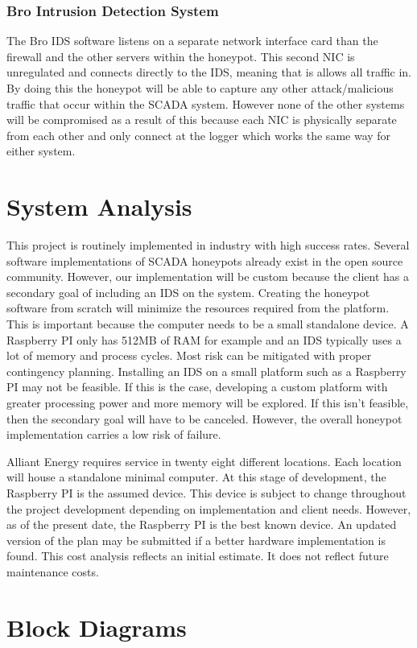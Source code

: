 \subsubsection{Bro Intrusion Detection System}
The Bro IDS software listens on a separate network interface card than the firewall and the other servers within the honeypot.  This second NIC is unregulated and connects directly to the IDS, meaning that is allows all traffic in.  By doing this the honeypot will be able to capture any other attack/malicious traffic that occur within the SCADA system.  However none of the other systems will be compromised as a result of this because each NIC is physically separate from each other and only connect at the logger which works the same way for either system.  

\section{System Analysis}
This project is routinely implemented in industry with high success rates. Several software implementations of SCADA honeypots already exist in the open source community. However, our implementation will be custom because the client has a secondary goal of including an IDS on the system. Creating the honeypot software from scratch will minimize the resources required from the platform. This is important because the computer needs to be a small standalone device. A Raspberry PI only has 512MB of RAM for example and an IDS typically uses a lot of memory and process cycles. Most risk can be mitigated with proper contingency planning. Installing an IDS on a small platform such as a Raspberry PI may not be feasible. If this is the case, developing a custom platform with greater processing power and more memory will be explored. If this isn't feasible, then the secondary goal will have to be canceled. However, the overall honeypot implementation carries a low risk of failure.

Alliant Energy requires service in twenty eight different locations. Each location will house a standalone minimal computer. At this stage of development, the Raspberry PI is the assumed device. This device is subject to change throughout the project development depending on implementation and client needs. However, as of the present date, the Raspberry PI is the best known device. An updated version of the plan may be submitted if a better hardware implementation is found. This cost analysis reflects an initial estimate. It does not reflect future maintenance costs.

\section{Block Diagrams}
